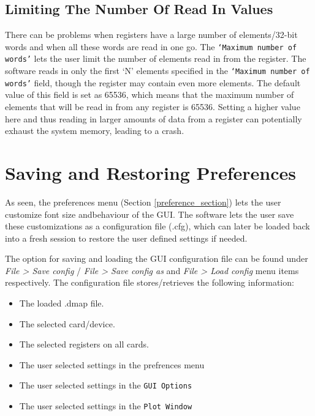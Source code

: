 \subsection{Limiting The Number Of Read In Values}\label{subsub::graph_x_axis}
There can be problems when registers have a large number of elements/32-bit
words and when all these words are read in one go. The \texttt{`Maximum number
of words'} lets the user limit the number of elements read in from the register.
The software reads in only the first `N' elements specified in the
\texttt{`Maximum number of words'} field, though the register may contain even
more elements. The default value of this field is set as 65536, which means that
the maximum number of elements that will be read in from any register is 65536.
Setting a higher value here and thus reading in larger amounts of data from a
register can potentially exhaust the system memory, leading to a crash.
		
\section{Saving and Restoring Preferences} 
As seen, the preferences menu (Section \ref{preference_section}) 
lets the user customize font size andbehaviour of the GUI. The software 
lets the user save these customizations as a
configuration file (.cfg), which can later be loaded back into a fresh session
to restore the user defined settings if needed.

The option for saving and loading the GUI configuration file can be found under
\textit{File > Save config} / \textit{File > Save config as} and \textit{File >
Load config }menu items respectively. The configuration file stores/retrieves
the following information:

\begin{itemize} 
	\item The loaded .dmap file. 
	\item The selected card/device.
    \item The selected registers on all cards. 
    \item The user selected
    settings in the prefrences menu 
    \item The user selected settings in the \texttt{GUI Options} 
    \item The user selected settings in the \texttt{Plot Window} 
\end{itemize}



%
%

